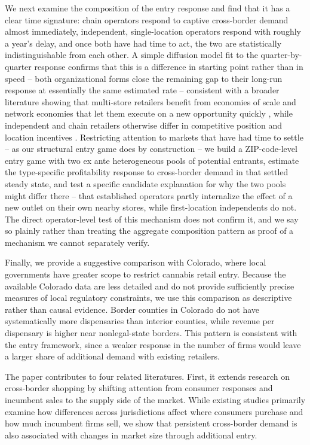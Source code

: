 \documentclass[english,12pt]{article}
\begin{document}
We next examine the composition of the entry response and find that it has a clear time signature: chain operators respond to captive cross-border demand almost immediately, independent, single-location operators respond with roughly a year's delay, and once both have had time to act, the two are statistically indistinguishable from each other. A simple diffusion model fit to the quarter-by-quarter response confirms that this is a difference in starting point rather than in speed -- both organizational forms close the remaining gap to their long-run response at essentially the same estimated rate -- consistent with a broader literature showing that multi-store retailers benefit from economies of scale and network economies that let them execute on a new opportunity quickly \citep{EllicksonHoughtonTimmins2013,HollenbeckGiroldo2022}, while independent and chain retailers otherwise differ in competitive position and location incentives \citep{AdamsEtAl2018,TalamasMarcos2025}. Restricting attention to markets that have had time to settle -- as our structural entry game does by construction -- we build a ZIP-code-level entry game with two ex ante heterogeneous pools of potential entrants, estimate the type-specific profitability response to cross-border demand in that settled steady state, and test a specific candidate explanation for why the two pools might differ there -- that established operators partly internalize the effect of a new outlet on their own nearby stores, while first-location independents do not. The direct operator-level test of this mechanism does not confirm it, and we say so plainly rather than treating the aggregate composition pattern as proof of a mechanism we cannot separately verify.

Finally, we provide a suggestive comparison with Colorado, where local governments have greater scope to restrict cannabis retail entry. Because the available Colorado data are less detailed and do not provide sufficiently precise measures of local regulatory constraints, we use this comparison as descriptive rather than causal evidence. Border counties in Colorado do not have systematically more dispensaries than interior counties, while revenue per dispensary is higher near nonlegal-state borders. This pattern is consistent with the entry framework, since a weaker response in the number of firms would leave a larger share of additional demand with existing retailers.

The paper contributes to four related literatures. First, it extends research on cross-border shopping by shifting attention from consumer responses and incumbent sales to the supply side of the market. While existing studies primarily examine how differences across jurisdictions affect where consumers purchase and how much incumbent firms sell, we show that persistent cross-border demand is also associated with changes in market size through additional entry.
\end{document}

